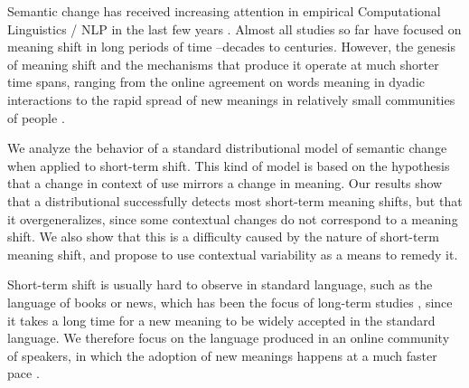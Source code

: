 Semantic change has received increasing attention in empirical Computational Linguistics / NLP in the last few years \cite{tang2018state}. Almost all studies so far have focused on meaning shift in long periods of time --decades to centuries. However, the genesis of meaning shift and the mechanisms that produce it operate at much shorter time spans, ranging
from the online agreement on words meaning in dyadic interactions \cite{brennan1996conceptual} to the rapid spread of new meanings in relatively small communities of people \cite{del2017semantic,del2018road}.
 

We  analyze the
 behavior of a standard distributional model of semantic change when
 applied to short-term shift.
This kind of model is based on the hypothesis that a change in context of use mirrors a change in meaning.
Our results show that a distributional successfully detects most short-term meaning shifts, but that it overgeneralizes, since some contextual changes do not correspond to a meaning shift.
We also show that this is a difficulty caused by the nature of short-term meaning shift, and propose to use contextual variability as a means to remedy it.

 

Short-term shift is usually hard to observe in standard language, such
as the language of books or news, which has been the focus of
long-term studies \cite{hamilton2016diachronic,kulkarni2015statistically}, since
it takes a long time for a new meaning to be widely accepted in the standard language. 
We therefore focus on the language produced in an online community of speakers, in which the 
adoption of new meanings happens at a much faster pace \cite{Clark96,hasan2009}.

